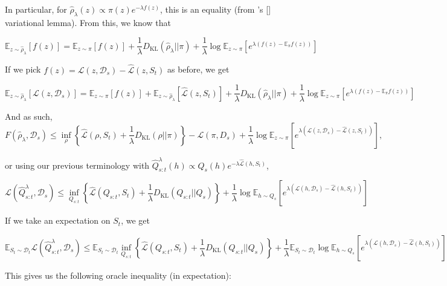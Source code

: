 \documentclass[letterpaper]{article}
\theoremstyle{definition}
\begin{document}
In particular, for $\hat{\rho}_\lambda(z)\propto \pi(z) e^{-\lambda f(z) }$, this is an equality (from \citeauthor{donsker1975large}'s [\citeyear{donsker1975large}] variational lemma).
From this, we know that

\begin{equation}
\mathbb{E}_{z\sim \hat{\rho}_\lambda}\left [f(z) \right ]= \mathbb{E}_{z\sim \pi}\left [f(z) \right ]+ \frac{1}{\lambda}D_{\mathrm{KL}}(\hat{\rho}_\lambda||\pi)+ \frac{1}{\lambda}\log\mathbb{E}_{z\sim \pi}\left [e^{\lambda(f(z)-\mathbb{E}_\pi f(z))} \right ]
\end{equation}

If we pick $f(z)=\mathcal{L}(z,\mathcal{D}_s)-\hat{\mathcal{L}}(z,S_t)$ as before, we get

$$\mathbb{E}_{z\sim \hat{\rho}_\lambda}\left [\mathcal{L}(z,\mathcal{D}_s) \right ]= \mathbb{E}_{z\sim \pi}\left [f(z) \right ]+\mathbb{E}_{z\sim \hat{\rho}_\lambda}\left [\hat{\mathcal{L}}(z,S_t) \right ]+ \frac{1}{\lambda}D_{\mathrm{KL}}(\hat{\rho}_\lambda||\pi)+ \frac{1}{\lambda}\log\mathbb{E}_{z\sim \pi}\left [e^{\lambda(f(z)-\mathbb{E}_\pi f(z))} \right ]$$

And as such,
$$F( \hat{\rho}_\lambda,\mathcal{D}_s)\leq \inf_{\rho}\left \{ \hat{\mathcal{L}}(\rho,S_t) + \frac{1}{\lambda}D_{\mathrm{KL}}(\rho||\pi)  \right \}-\mathcal{L}(\pi,D_s)+\frac{1}{\lambda}\log\mathbb{E}_{z\sim \pi}\left [e^{\lambda(\mathcal{L}(z,\mathcal{D}_s)-\hat{\mathcal{L}}(z,S_t))} \right ],$$

or using our previous terminology with $\hat{Q}^{\lambda}_{s:t}(h)\propto Q_s(h)e^{-\lambda\hat{\mathcal{L}}(h,S_t)}$, 

$$\mathcal{L}( \hat{Q}^{\lambda}_{s:t},\mathcal{D}_s)\leq \inf_{Q_{s:t}}\left \{ \hat{\mathcal{L}}(Q_{s:t},S_t) + \frac{1}{\lambda}D_{\mathrm{KL}}(Q_{s:t}||Q_{s}) \right \}+\frac{1}{\lambda}\log\mathbb{E}_{h\sim Q_s}\left [e^{\lambda(\mathcal{L}(h,\mathcal{D}_s)-\hat{\mathcal{L}}(h,S_t))} \right ]$$

If we take an expectation on $S_t$, we get

$$\mathbb{E}_{S_t\sim \mathcal{D}_t}\mathcal{L}( \hat{Q}^{\lambda}_{s:t},\mathcal{D}_s)\leq \mathbb{E}_{S_t\sim \mathcal{D}_t}\inf_{Q_{s:t}}\left \{ \hat{\mathcal{L}}(Q_{s:t},S_t) + \frac{1}{\lambda}D_{\mathrm{KL}}(Q_{s:t}||Q_{s}) \right \}+\frac{1}{\lambda}\mathbb{E}_{S_t\sim \mathcal{D}_t}\log\mathbb{E}_{h\sim Q_s}\left [e^{\lambda(\mathcal{L}(h,\mathcal{D}_s)-\hat{\mathcal{L}}(h,S_t))} \right ]$$

This gives us the following oracle inequality (in expectation):
\end{document}
